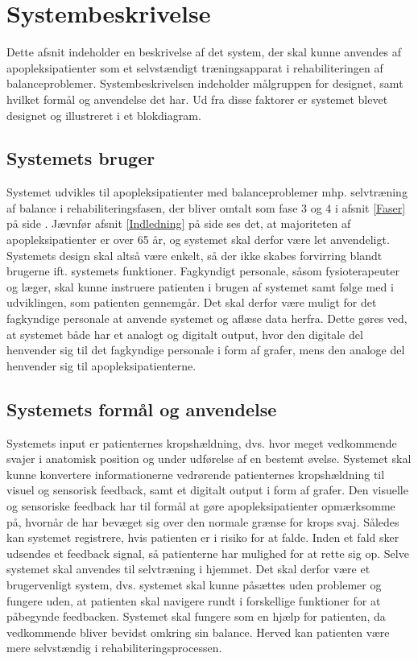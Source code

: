 \section{Systembeskrivelse}  
Dette afsnit indeholder en beskrivelse af det system, der skal kunne anvendes af apopleksipatienter som et selvstændigt træningsapparat i rehabiliteringen af balanceproblemer. Systembeskrivelsen indeholder målgruppen for designet, samt hvilket formål og anvendelse det har. Ud fra disse faktorer er systemet blevet designet og illustreret i et blokdiagram. 

\subsection{Systemets bruger}
Systemet udvikles til apopleksipatienter med balanceproblemer mhp. selvtræning af balance i rehabiliteringsfasen, der bliver omtalt som fase 3 og 4 i afsnit \ref{Faser} på side \pageref{Faser}. Jævnfør afsnit \ref{Indledning} på side \pageref{Indledning} ses det, at majoriteten af apopleksipatienter er over 65 år, og systemet skal derfor være let anvendeligt. Systemets design skal altså være enkelt, så der ikke skabes forvirring blandt brugerne ift. systemets funktioner. Fagkyndigt personale, såsom fysioterapeuter og læger, skal kunne instruere patienten i brugen af systemet samt følge med i udviklingen, som patienten gennemgår. Det skal derfor være muligt for det fagkyndige personale at anvende systemet og aflæse data herfra. Dette gøres ved, at systemet både har et analogt og digitalt output, hvor den digitale del henvender sig til det fagkyndige personale i form af grafer, mens den analoge del henvender sig til apopleksipatienterne.    

\subsection{Systemets formål og anvendelse}
Systemets input er patienternes kropshældning, dvs. hvor meget vedkommende svajer i anatomisk position og under udførelse af en bestemt øvelse. Systemet skal kunne konvertere informationerne vedrørende patienternes kropshældning til visuel og sensorisk feedback, samt et digitalt output i form af grafer. Den visuelle og sensoriske feedback har til formål at gøre apopleksipatienter opmærksomme på, hvornår de har bevæget sig over den normale grænse for krops svaj. Således kan systemet registrere, hvis patienten er i risiko for at falde. Inden et fald sker udsendes et feedback signal, så patienterne har mulighed for at rette sig op. Selve systemet skal anvendes til selvtræning i hjemmet. Det skal derfor være et brugervenligt system, dvs. systemet skal kunne påsættes uden problemer og fungere uden, at patienten skal navigere rundt i forskellige funktioner for at påbegynde feedbacken. Systemet skal fungere som en hjælp for patienten, da vedkommende bliver bevidst omkring sin balance. Herved kan patienten være mere selvstændig i rehabiliteringsprocessen.

